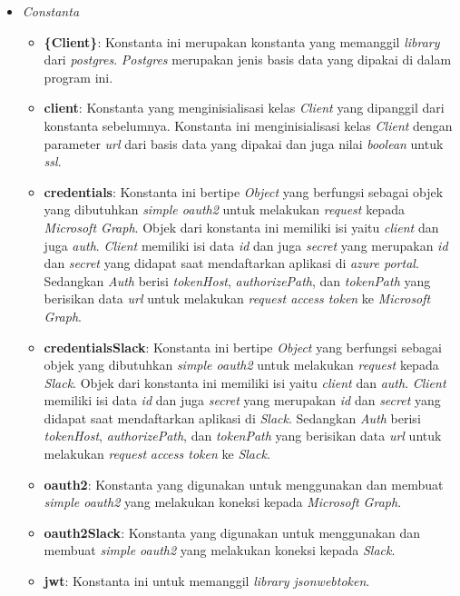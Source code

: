 \begin{itemize}
    \item \textit{Constanta}
    \begin{itemize}
        \item \textbf{\{Client\}}: Konstanta ini merupakan konstanta yang memanggil \textit{library} dari \textit{postgres}. \textit{Postgres} merupakan jenis basis data yang dipakai di dalam program ini. 
        \item \textbf{client}: Konstanta yang menginisialisasi kelas \textit{Client} yang dipanggil dari konstanta sebelumnya. Konstanta ini menginisialisasi kelas \textit{Client} dengan parameter \textit{url} dari basis data yang dipakai dan juga nilai \textit{boolean} untuk \textit{ssl}.  
        \item \textbf{credentials}: Konstanta ini bertipe \textit{Object} yang berfungsi sebagai objek yang dibutuhkan \textit{simple oauth2} untuk melakukan \textit{request} kepada \textit{Microsoft Graph}. Objek dari konstanta ini memiliki isi yaitu \textit{client} dan juga \textit{auth}. \textit{Client} memiliki isi data \textit{id} dan juga \textit{secret} yang merupakan \textit{id} dan \textit{secret} yang didapat saat mendaftarkan aplikasi di \textit{azure portal}. Sedangkan \textit{Auth} berisi \textit{tokenHost}, \textit{authorizePath}, dan \textit{tokenPath} yang berisikan data \textit{url} untuk melakukan \textit{request access token} ke \textit{Microsoft Graph}. 
        \item \textbf{credentialsSlack}: Konstanta ini bertipe \textit{Object} yang berfungsi sebagai objek yang dibutuhkan \textit{simple oauth2} untuk melakukan \textit{request} kepada \textit{Slack}. Objek dari konstanta ini memiliki isi yaitu \textit{client} dan \textit{auth}. \textit{Client} memiliki isi data \textit{id} dan juga \textit{secret} yang merupakan \textit{id} dan \textit{secret} yang didapat saat mendaftarkan aplikasi di \textit{Slack}. Sedangkan \textit{Auth} berisi \textit{tokenHost}, \textit{authorizePath}, dan \textit{tokenPath} yang berisikan data \textit{url} untuk melakukan \textit{request} \textit{access token} ke \textit{Slack}.
        \item \textbf{oauth2}: Konstanta yang digunakan untuk menggunakan dan membuat \textit{simple oauth2} yang melakukan koneksi kepada \textit{Microsoft Graph}. 
        \item \textbf{oauth2Slack}: Konstanta yang digunakan untuk menggunakan dan membuat \textit{simple oauth2} yang melakukan koneksi kepada \textit{Slack}. 
        \item \textbf{jwt}: Konstanta ini untuk memanggil \textit{library jsonwebtoken}. 

\end{itemize}
\end{itemize}
